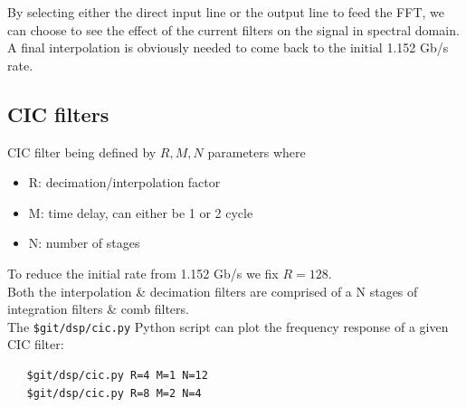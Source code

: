 \documentclass{article}
\begin{document}
By selecting either the direct input line
or the output line to feed the FFT, we
can choose to see the effect of the current filters
on the signal in spectral domain. \\

A final interpolation is obviously
needed to come back to the initial 1.152 Gb/s rate.

\newpage
\subsection{CIC filters}

CIC filter being defined by $R, M, N$ parameters where

\begin{itemize}
	\item R: decimation/interpolation factor
	\item M: time delay, can either be 1 or 2 cycle
	\item N: number of stages
\end{itemize}

\vspace{0.2cm}
To reduce the initial rate from 1.152 Gb/s we fix
$R = 128$. \\

Both the interpolation \& decimation filters
are comprised of a N stages of integration filters
\& comb filters. \\

The {\tt \$git/dsp/cic.py} Python script 
can plot the frequency response
of a given CIC filter:

\begin{verbatim}
   $git/dsp/cic.py R=4 M=1 N=12
   $git/dsp/cic.py R=8 M=2 N=4
\end{verbatim}

\end{document}
